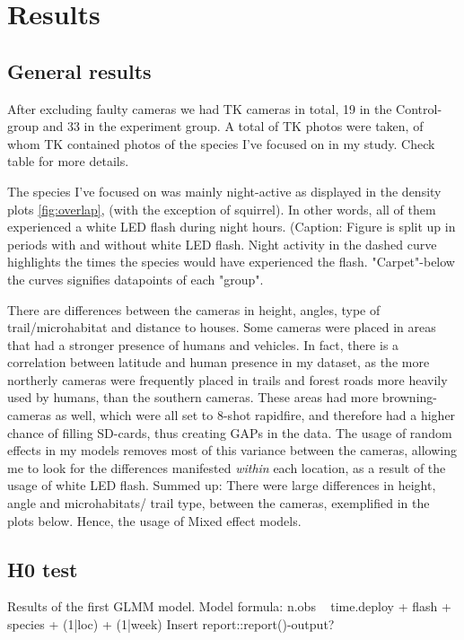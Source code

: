 \section{Results}
\subsection{General results}

After excluding faulty cameras we had TK cameras in total, 19 in the Control-group and 33 in the experiment group.
A total of TK photos were taken, of whom TK contained photos of the species I've focused on in my study. Check table for more details.

The species I've focused on was mainly night-active as displayed in the density plots \ref{fig:overlap}, (with the exception of squirrel). In other words, all of them experienced a white LED flash during night hours.
(Caption: Figure is split up in periods with and without white LED flash. Night activity in the dashed curve highlights the times the species would have experienced the flash. "Carpet"-below the curves signifies datapoints of each "group".

There are differences between the cameras in height, angles, type of trail/microhabitat and distance to houses. Some cameras were placed in areas that had a stronger presence of humans and vehicles. In fact, there is a correlation between latitude and human presence in my dataset, as the more northerly cameras were frequently placed in trails and forest roads more heavily used by humans, than the southern cameras.
These areas had more browning-cameras as well, which were all set to 8-shot rapidfire, and therefore had a higher chance of filling SD-cards, thus creating GAPs in the data.
The usage of random effects in my models removes most of this variance between the cameras, allowing me to look for the differences manifested \emph{within} each location, as a result of the usage of white LED flash.
Summed up:
There were large differences in height, angle and microhabitats/ trail type, between the cameras, exemplified in the plots below. Hence, the usage of Mixed effect models.



\subsection{H0 test}
Results of the first GLMM model.
Model formula: n.obs ~ time.deploy + flash + species + (1|loc) + (1|week)
Insert report::report()-output?






